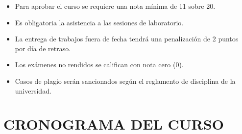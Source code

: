 \documentclass[12pt,a4paper]{article}
\begin{document}

\begin{tcolorbox}[colback=pucpRojo!5,colframe=pucpRojo,title=\textbf{Políticas de Evaluación}]
\begin{itemize}[leftmargin=*]
    \item Para aprobar el curso se requiere una nota mínima de 11 sobre 20.
    \item Es obligatoria la asistencia a las sesiones de laboratorio.
    \item La entrega de trabajos fuera de fecha tendrá una penalización de 2 puntos por día de retraso.
    \item Los exámenes no rendidos se califican con nota cero (0).
    \item Casos de plagio serán sancionados según el reglamento de disciplina de la universidad.
\end{itemize}
\end{tcolorbox}
\vspace{0.5cm}

\section{CRONOGRAMA DEL CURSO}
\end{document}
